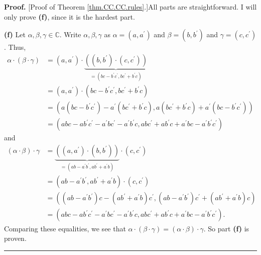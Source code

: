 \documentclass[numbers=enddot,12pt,final,onecolumn,notitlepage]{scrartcl}%
\numberwithin{exer}{subsection}
\theoremstyle{definition}
\newenvironment{proof}[1][Proof]{\noindent\textbf{#1.} }{\ \rule{0.5em}{0.5em}}
\begin{document}
\begin{proof}
[Proof of Theorem \ref{thm.CC.CC.rules}.]All parts are straightforward. I will
only prove \textbf{(f)}, since it is the hardest part.

\textbf{(f)} Let $\alpha,\beta,\gamma\in\mathbb{C}$. Write $\alpha
,\beta,\gamma$ as $\alpha=\left(  a,a^{\prime}\right)  $ and $\beta=\left(
b,b^{\prime}\right)  $ and $\gamma=\left(  c,c^{\prime}\right)  $. Thus,%
\begin{align*}
\alpha\cdot\left(  \beta\cdot\gamma\right)   &  =\left(  a,a^{\prime}\right)
\cdot\underbrace{\left(  \left(  b,b^{\prime}\right)  \cdot\left(
c,c^{\prime}\right)  \right)  }_{=\left(  bc-b^{\prime}c^{\prime},bc^{\prime
}+b^{\prime}c\right)  }\\
&  =\left(  a,a^{\prime}\right)  \cdot\left(  bc-b^{\prime}c^{\prime
},bc^{\prime}+b^{\prime}c\right) \\
&  =\left(  a\left(  bc-b^{\prime}c^{\prime}\right)  -a^{\prime}\left(
bc^{\prime}+b^{\prime}c\right)  ,a\left(  bc^{\prime}+b^{\prime}c\right)
+a^{\prime}\left(  bc-b^{\prime}c^{\prime}\right)  \right) \\
&  =\left(  abc-ab^{\prime}c^{\prime}-a^{\prime}bc^{\prime}-a^{\prime
}b^{\prime}c,abc^{\prime}+ab^{\prime}c+a^{\prime}bc-a^{\prime}b^{\prime
}c^{\prime}\right)
\end{align*}
\newline and%
\begin{align*}
\left(  \alpha\cdot\beta\right)  \cdot\gamma &  =\underbrace{\left(  \left(
a,a^{\prime}\right)  \cdot\left(  b,b^{\prime}\right)  \right)  }_{=\left(
ab-a^{\prime}b^{\prime},ab^{\prime}+a^{\prime}b\right)  }\cdot\left(
c,c^{\prime}\right) \\
&  =\left(  ab-a^{\prime}b^{\prime},ab^{\prime}+a^{\prime}b\right)
\cdot\left(  c,c^{\prime}\right) \\
&  =\left(  \left(  ab-a^{\prime}b^{\prime}\right)  c-\left(  ab^{\prime
}+a^{\prime}b\right)  c^{\prime},\left(  ab-a^{\prime}b^{\prime}\right)
c^{\prime}+\left(  ab^{\prime}+a^{\prime}b\right)  c\right) \\
&  =\left(  abc-ab^{\prime}c^{\prime}-a^{\prime}bc^{\prime}-a^{\prime
}b^{\prime}c,abc^{\prime}+ab^{\prime}c+a^{\prime}bc-a^{\prime}b^{\prime
}c^{\prime}\right)  .
\end{align*}
Comparing these equalities, we see that $\alpha\cdot\left(  \beta\cdot
\gamma\right)  =\left(  \alpha\cdot\beta\right)  \cdot\gamma$. So part
\textbf{(f)} is proven.
\end{proof}
\end{document}
